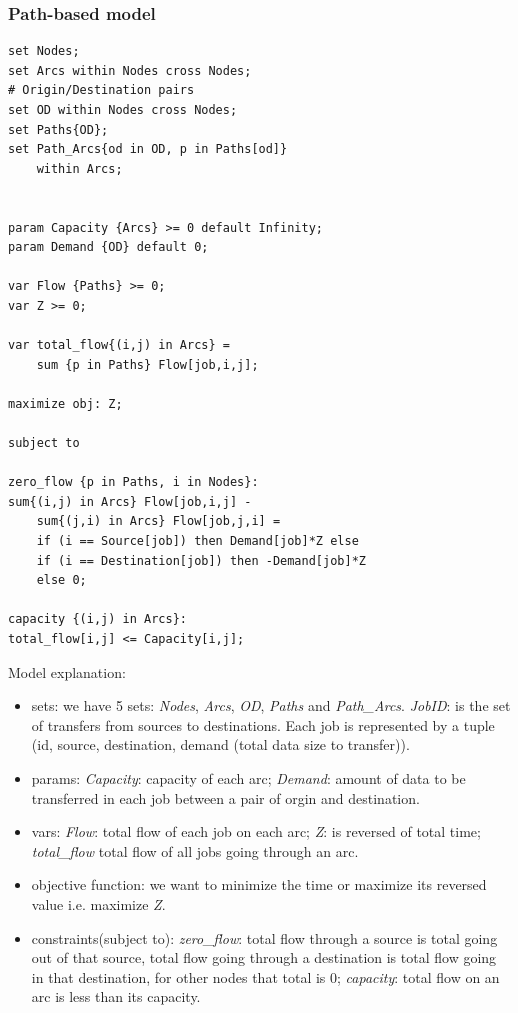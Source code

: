\subsubsection{Path-based model}

\begingroup
\fontsize{9pt}{10pt}\selectfont

\begin{verbatim}
set Nodes;
set Arcs within Nodes cross Nodes;
# Origin/Destination pairs
set OD within Nodes cross Nodes;
set Paths{OD};
set Path_Arcs{od in OD, p in Paths[od]}
    within Arcs;


param Capacity {Arcs} >= 0 default Infinity;
param Demand {OD} default 0;

var Flow {Paths} >= 0;
var Z >= 0;

var total_flow{(i,j) in Arcs} = 
    sum {p in Paths} Flow[job,i,j];

maximize obj: Z;

subject to

zero_flow {p in Paths, i in Nodes}:
sum{(i,j) in Arcs} Flow[job,i,j] - 
    sum{(j,i) in Arcs} Flow[job,j,i] =
    if (i == Source[job]) then Demand[job]*Z else 
    if (i == Destination[job]) then -Demand[job]*Z 
    else 0;

capacity {(i,j) in Arcs}:
total_flow[i,j] <= Capacity[i,j];
\end{verbatim}

\endgroup

Model explanation:
\begin{itemize}
\item sets: we have 5 sets: \textit{Nodes}, \textit{Arcs}, \textit{OD}, \textit{Paths} and \textit{Path\_Arcs}. \textit{JobID}: is the set of transfers from sources to destinations. Each job is represented by a tuple (id, source, destination, demand (total data size to transfer)).
\item params: {\it Capacity}: capacity of each arc; {\it Demand}: amount of data to be transferred in each job between a pair of orgin and destination.
\item vars: \textit{Flow}: total flow of each job on each arc; \textit{Z}: is reversed of total time; \textit{total\_flow} total flow of all jobs going through an arc.
\item objective function: we want to minimize the time or maximize its reversed value i.e. maximize \textit{Z}.
\item constraints(subject to): \textit{zero\_flow}: total flow through a source is total going out of that source, total flow going through a destination is total flow going in that destination, for other nodes that total is 0; \textit{capacity}: total flow on an arc is less than its capacity.
\end{itemize}

